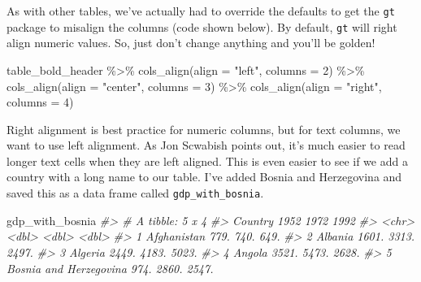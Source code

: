 \documentclass[
]{book}
\newenvironment{Shaded}{\begin{snugshade}}{\end{snugshade}}
\newcommand{\AttributeTok}[1]{\textcolor[rgb]{0.77,0.63,0.00}{#1}}
\newcommand{\CommentTok}[1]{\textcolor[rgb]{0.56,0.35,0.01}{\textit{#1}}}
\newcommand{\DecValTok}[1]{\textcolor[rgb]{0.00,0.00,0.81}{#1}}
\newcommand{\FunctionTok}[1]{\textcolor[rgb]{0.00,0.00,0.00}{#1}}
\newcommand{\NormalTok}[1]{#1}
\newcommand{\SpecialCharTok}[1]{\textcolor[rgb]{0.00,0.00,0.00}{#1}}
\newcommand{\StringTok}[1]{\textcolor[rgb]{0.31,0.60,0.02}{#1}}
\begin{document}
As with other tables, we've actually had to override the defaults to get the \texttt{gt} package to misalign the columns (code shown below). By default, \texttt{gt} will right align numeric values. So, just don't change anything and you'll be golden!

\begin{Shaded}
\begin{Highlighting}[]
\NormalTok{table\_bold\_header }\SpecialCharTok{\%\textgreater{}\%} 
  \FunctionTok{cols\_align}\NormalTok{(}\AttributeTok{align =} \StringTok{"left"}\NormalTok{,}
             \AttributeTok{columns =} \DecValTok{2}\NormalTok{) }\SpecialCharTok{\%\textgreater{}\%} 
  \FunctionTok{cols\_align}\NormalTok{(}\AttributeTok{align =} \StringTok{"center"}\NormalTok{,}
             \AttributeTok{columns =} \DecValTok{3}\NormalTok{) }\SpecialCharTok{\%\textgreater{}\%} 
  \FunctionTok{cols\_align}\NormalTok{(}\AttributeTok{align =} \StringTok{"right"}\NormalTok{,}
             \AttributeTok{columns =} \DecValTok{4}\NormalTok{)}
\end{Highlighting}
\end{Shaded}

Right alignment is best practice for numeric columns, but for text columns, we want to use left alignment. As Jon Scwabish points out, it's much easier to read longer text cells when they are left aligned. This is even easier to see if we add a country with a long name to our table. I've added Bosnia and Herzegovina and saved this as a data frame called \texttt{gdp\_with\_bosnia}.

\begin{Shaded}
\begin{Highlighting}[]
\NormalTok{gdp\_with\_bosnia}
\CommentTok{\#\textgreater{} \# A tibble: 5 x 4}
\CommentTok{\#\textgreater{}   Country                \textasciigrave{}1952\textasciigrave{} \textasciigrave{}1972\textasciigrave{} \textasciigrave{}1992\textasciigrave{}}
\CommentTok{\#\textgreater{}   \textless{}chr\textgreater{}                   \textless{}dbl\textgreater{}  \textless{}dbl\textgreater{}  \textless{}dbl\textgreater{}}
\CommentTok{\#\textgreater{} 1 Afghanistan              779.   740.   649.}
\CommentTok{\#\textgreater{} 2 Albania                 1601.  3313.  2497.}
\CommentTok{\#\textgreater{} 3 Algeria                 2449.  4183.  5023.}
\CommentTok{\#\textgreater{} 4 Angola                  3521.  5473.  2628.}
\CommentTok{\#\textgreater{} 5 Bosnia and Herzegovina   974.  2860.  2547.}
\end{Highlighting}
\end{Shaded}
\end{document}
